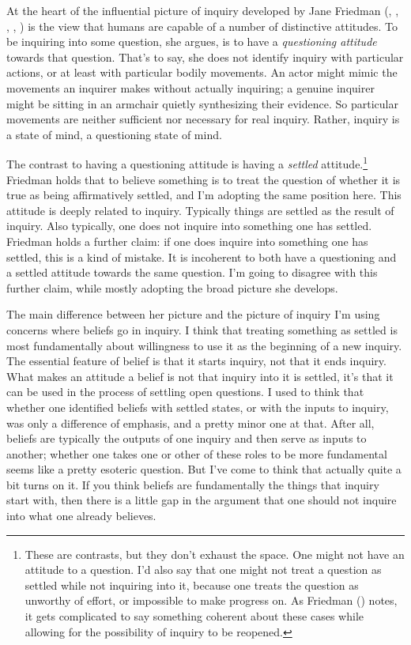 \documentclass[
  10pt,
  letterpaper,
  twoside]{scrbook}
\begin{document}
At the heart of the influential picture of inquiry developed by Jane
Friedman (,
,
, ,
) is the view that humans are capable
of a number of distinctive attitudes. To be inquiring into some
question, she argues, is to have a \emph{questioning attitude} towards
that question. That's to say, she does not identify inquiry with
particular actions, or at least with particular bodily movements. An
actor might mimic the movements an inquirer makes without actually
inquiring; a genuine inquirer might be sitting in an armchair quietly
synthesizing their evidence. So particular movements are neither
sufficient nor necessary for real inquiry. Rather, inquiry is a state of
mind, a questioning state of mind.

The contrast to having a questioning attitude is having a \emph{settled}
attitude.\footnote{These are contrasts, but they don't exhaust the
  space. One might not have an attitude to a question. I'd also say that
  one might not treat a question as settled while not inquiring into it,
  because one treats the question as unworthy of effort, or impossible
  to make progress on. As Friedman
  () notes, it gets complicated
  to say something coherent about these cases while allowing for the
  possibility of inquiry to be reopened.} Friedman holds that to believe
something is to treat the question of whether it is true as being
affirmatively settled, and I'm adopting the same position here. This
attitude is deeply related to inquiry. Typically things are settled as
the result of inquiry. Also typically, one does not inquire into
something one has settled. Friedman holds a further claim: if one does
inquire into something one has settled, this is a kind of mistake. It is
incoherent to both have a questioning and a settled attitude towards the
same question. I'm going to disagree with this further claim, while
mostly adopting the broad picture she develops.

The main difference between her picture and the picture of inquiry I'm
using concerns where beliefs go in inquiry. I think that treating
something as settled is most fundamentally about willingness to use it
as the beginning of a new inquiry. The essential feature of belief is
that it starts inquiry, not that it ends inquiry. What makes an attitude
a belief is not that inquiry into it is settled, it's that it can be
used in the process of settling open questions. I used to think that
whether one identified beliefs with settled states, or with the inputs
to inquiry, was only a difference of emphasis, and a pretty minor one at
that. After all, beliefs are typically the outputs of one inquiry and
then serve as inputs to another; whether one takes one or other of these
roles to be more fundamental seems like a pretty esoteric question. But
I've come to think that actually quite a bit turns on it. If you think
beliefs are fundamentally the things that inquiry start with, then there
is a little gap in the argument that one should not inquire into what
one already believes.
\end{document}

